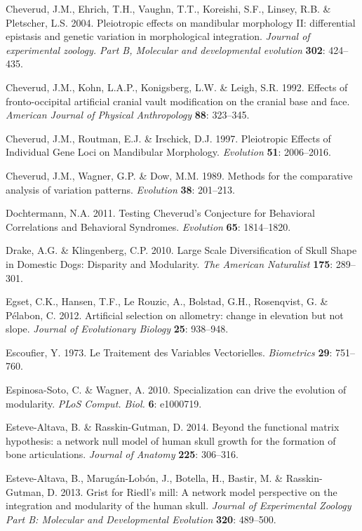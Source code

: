 \documentclass[12pt,twoside]{report}
\begin{document}
Cheverud, J.M., Ehrich, T.H., Vaughn, T.T., Koreishi, S.F., Linsey, R.B.
\& Pletscher, L.S. 2004. Pleiotropic effects on mandibular morphology
II: differential epistasis and genetic variation in morphological
integration. \emph{Journal of experimental zoology. Part B, Molecular
and developmental evolution} \textbf{302}: 424--435.

Cheverud, J.M., Kohn, L.A.P., Konigsberg, L.W. \& Leigh, S.R. 1992.
Effects of fronto-occipital artificial cranial vault modification on the
cranial base and face. \emph{American Journal of Physical Anthropology}
\textbf{88}: 323--345.

Cheverud, J.M., Routman, E.J. \& Irschick, D.J. 1997. Pleiotropic
Effects of Individual Gene Loci on Mandibular Morphology.
\emph{Evolution} \textbf{51}: 2006--2016.

Cheverud, J.M., Wagner, G.P. \& Dow, M.M. 1989. Methods for the
comparative analysis of variation patterns. \emph{Evolution}
\textbf{38}: 201--213.

Dochtermann, N.A. 2011. Testing Cheverud's Conjecture for Behavioral
Correlations and Behavioral Syndromes. \emph{Evolution} \textbf{65}:
1814--1820.

Drake, A.G. \& Klingenberg, C.P. 2010. Large Scale Diversification of
Skull Shape in Domestic Dogs: Disparity and Modularity. \emph{The
American Naturalist} \textbf{175}: 289--301.

Egset, C.K., Hansen, T.F., Le Rouzic, A., Bolstad, G.H., Rosenqvist, G.
\& Pélabon, C. 2012. Artificial selection on allometry: change in
elevation but not slope. \emph{Journal of Evolutionary Biology}
\textbf{25}: 938--948.

Escoufier, Y. 1973. Le Traitement des Variables Vectorielles.
\emph{Biometrics} \textbf{29}: 751--760.

Espinosa-Soto, C. \& Wagner, A. 2010. Specialization can drive the
evolution of modularity. \emph{PLoS Comput. Biol.} \textbf{6}: e1000719.

Esteve-Altava, B. \& Rasskin-Gutman, D. 2014. Beyond the functional
matrix hypothesis: a network null model of human skull growth for the
formation of bone articulations. \emph{Journal of Anatomy} \textbf{225}:
306--316.

Esteve-Altava, B., Marugán-Lobón, J., Botella, H., Bastir, M. \&
Rasskin-Gutman, D. 2013. Grist for Riedl's mill: A network model
perspective on the integration and modularity of the human skull.
\emph{Journal of Experimental Zoology Part B: Molecular and
Developmental Evolution} \textbf{320}: 489--500.
\end{document}
